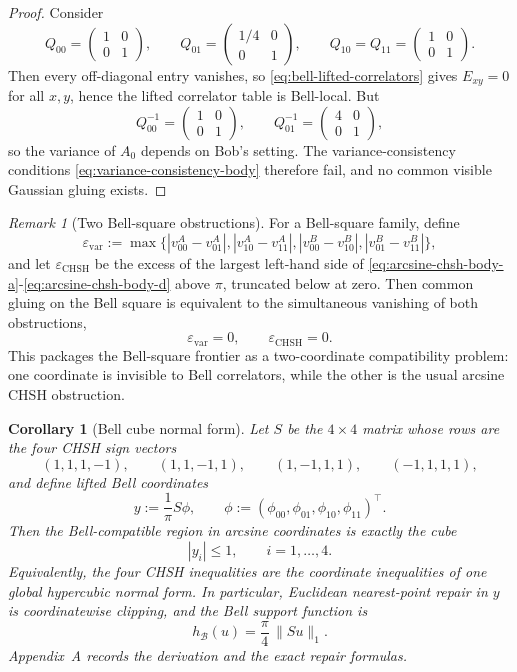 \documentclass[11pt]{article}
\numberwithin{equation}{section}
\theoremstyle{thmcompact}
\newtheorem{corollary}[theorem]{Corollary}
\theoremstyle{remark}
\newtheorem*{remarkplain}{Remark}
\newenvironment{remark}[1][]%
{\begin{remarkbox}\begin{remarkplain}[#1]\normalfont}
		{\end{remarkplain}\end{remarkbox}}
\begin{document}
\begin{proof}
Consider
\[
Q_{00}=\begin{pmatrix}1&0\\0&1\end{pmatrix},
\qquad
Q_{01}=\begin{pmatrix}1/4&0\\0&1\end{pmatrix},
\qquad
Q_{10}=Q_{11}=\begin{pmatrix}1&0\\0&1\end{pmatrix}.
\]
Then every off-diagonal entry vanishes, so \eqref{eq:bell-lifted-correlators} gives $E_{xy}=0$ for all $x,y$, hence the lifted correlator table is Bell-local. But
\[
Q_{00}^{-1}=\begin{pmatrix}1&0\\0&1\end{pmatrix},
\qquad
Q_{01}^{-1}=\begin{pmatrix}4&0\\0&1\end{pmatrix},
\]
so the variance of $A_0$ depends on Bob's setting. The variance-consistency conditions \eqref{eq:variance-consistency-body} therefore fail, and no common visible Gaussian gluing exists.
\end{proof}

\begin{remark}[Two Bell-square obstructions]\label{rem:two-bell-obstructions}
For a Bell-square family, define
\begin{equation}\label{eq:epsilon-var}
\varepsilon_{\mathrm{var}}:=\max\!\bigl\{|v^A_{00}-v^A_{01}|,|v^A_{10}-v^A_{11}|,|v^B_{00}-v^B_{10}|,|v^B_{01}-v^B_{11}|\bigr\},
\end{equation}
and let $\varepsilon_{\mathrm{CHSH}}$ be the excess of the largest left-hand side of \eqref{eq:arcsine-chsh-body-a}-\eqref{eq:arcsine-chsh-body-d} above $\pi$, truncated below at zero. Then common gluing on the Bell square is equivalent to the simultaneous vanishing of both obstructions,
\[
\varepsilon_{\mathrm{var}}=0,
\qquad
\varepsilon_{\mathrm{CHSH}}=0.
\]
This packages the Bell-square frontier as a two-coordinate compatibility problem: one coordinate is invisible to Bell correlators, while the other is the usual arcsine CHSH obstruction.
\end{remark}

\begin{corollary}[Bell cube normal form]\label{cor:bell-cube-body}
Let $S$ be the $4\times 4$ matrix whose rows are the four CHSH sign vectors
\[
(1,1,1,-1),\qquad (1,1,-1,1),\qquad (1,-1,1,1),\qquad (-1,1,1,1),
\]
and define lifted Bell coordinates
\[
y:=\frac{1}{\pi}S\phi,
\qquad
\phi:=(\phi_{00},\phi_{01},\phi_{10},\phi_{11})^\top.
\]
Then the Bell-compatible region in arcsine coordinates is exactly the cube
\[
|y_i|\le 1,
\qquad i=1,\dots,4.
\]
Equivalently, the four CHSH inequalities are the coordinate inequalities of one global hypercubic normal form. In particular, Euclidean nearest-point repair in $y$ is coordinatewise clipping, and the Bell support function is
\[
h_{\mathcal B}(u)=\frac{\pi}{4}\,\|Su\|_1.
\]
Appendix~A records the derivation and the exact repair formulas.
\end{corollary}
\end{document}
